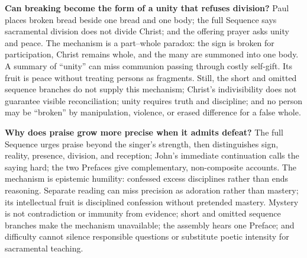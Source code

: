 \noindent\textbf{Can breaking become the form of a unity that refuses division?\enspace{}}
Paul places broken bread beside one bread and one body; the full Sequence says sacramental division does not divide Christ; and the offering prayer asks unity and peace. The mechanism is a part--whole paradox: the sign is broken for participation, Christ remains whole, and the many are summoned into one body. A summary of “unity” can miss communion passing through costly self-gift. Its fruit is peace without treating persons as fragments. Still, the short and omitted sequence branches do not supply this mechanism; Christ's indivisibility does not guarantee visible reconciliation; unity requires truth and discipline; and no person may be “broken” by manipulation, violence, or erased difference for a false whole.

\noindent\textbf{Why does praise grow more precise when it admits defeat?\enspace{}}
The full Sequence urges praise beyond the singer's strength, then distinguishes sign, reality, presence, division, and reception; John's immediate continuation calls the saying hard; the two Prefaces give complementary, non-composite accounts. The mechanism is epistemic humility: confessed excess disciplines rather than ends reasoning. Separate reading can miss precision as adoration rather than mastery; its intellectual fruit is disciplined confession without pretended mastery. Mystery is not contradiction or immunity from evidence; short and omitted sequence branches make the mechanism unavailable; the assembly hears one Preface; and difficulty cannot silence responsible questions or substitute poetic intensity for sacramental teaching.
